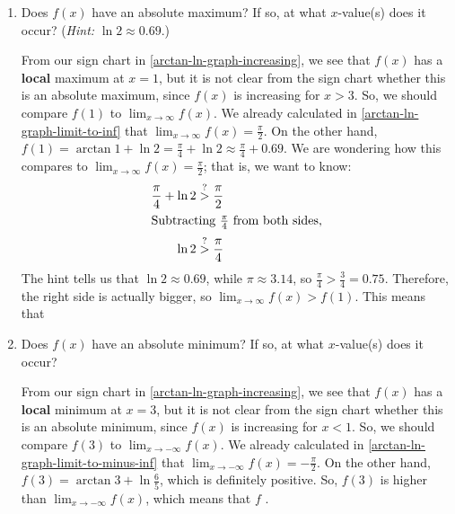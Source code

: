 \documentclass{article}
\begin{document}
\begin{enumerate}
\begin{enumerate}
  \item
    \begin{problem}[\vfill]
      Does $f(x)$ have an absolute maximum?  If so, at what $x$-value(s)
      does it occur?  (\emph{Hint:} $\ln 2 \approx 0.69$.)
    \end{problem}

    \begin{solution}
      From our sign chart in \ref{arctan-ln-graph-increasing}, we see that
      $f(x)$ has a \textbf{local} maximum at $x = 1$, but it is not clear
      from the sign chart whether this is an absolute maximum, since
      $f(x)$ is increasing for $x > 3$.  So, we should compare $f(1)$ to
      $\displaystyle \lim_{x \to \infty} f(x)$.  We already calculated in
      \ref{arctan-ln-graph-limit-to-inf} that $\displaystyle \lim_{x \to
        \infty} f(x) = \frac{\pi}{2}$.  On the other hand, $f(1) = \arctan
      1 + \ln 2 = \frac{\pi}{4} + \ln 2 \approx \frac{\pi}{4} + 0.69$.  We
      are wondering how this compares to $\displaystyle \lim_{x \to
        \infty} f(x) = \frac{\pi}{2}$; that is, we want to know:
      \begin{align*}
        \frac{\pi}{4} + \ln 2 & \stackrel{?}{>} \frac{\pi}{2} \\
        \intertext{Subtracting $\frac{\pi}{4}$ from both sides,}
        \ln 2 & \stackrel{?}{>} \frac{\pi}{4} 
      \end{align*}
      The hint tells us that $\ln 2 \approx 0.69$, while $\pi \approx
      3.14$, so $\frac{\pi}{4} > \frac{3}{4} = 0.75$.  Therefore, the
      right side is actually bigger, so $\displaystyle \lim_{x \to \infty}
      f(x) > f(1)$.  This means that
      \begin{center}
      \end{center}
    \end{solution}

  \item
    \begin{problem}[\vfill]
      Does $f(x)$ have an absolute minimum?  If so, at what $x$-value(s)
      does it occur?
    \end{problem}

    \begin{solution}
      From our sign chart in \ref{arctan-ln-graph-increasing}, we see that
      $f(x)$ has a \textbf{local} minimum at $x = 3$, but it is not clear
      from the sign chart whether this is an absolute minimum, since
      $f(x)$ is increasing for $x < 1$.  So, we should compare $f(3)$ to
      $\displaystyle \lim_{x \to -\infty} f(x)$.  We already calculated in
      \ref{arctan-ln-graph-limit-to-minus-inf} that $\displaystyle \lim_{x
        \to -\infty} f(x) = - \frac{\pi}{2}$.  On the other hand, $f(3) =
      \arctan 3 + \ln \frac{6}{5}$, which is definitely positive.  So,
      $f(3)$ is higher than $\displaystyle \lim_{x \to -\infty} f(x)$,
      which means that $f$ .
    \end{solution}


\end{enumerate}
\end{enumerate}
\end{document}
